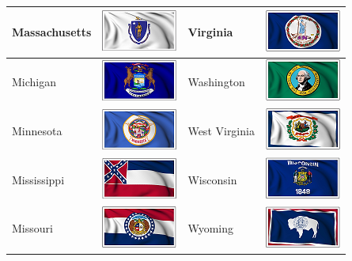 \documentclass{ximera}
\begin{document}
\begin{center}
\begin{tabular}{|l|l|l|l|}
Massachusetts & \includegraphics{pics/StateFlags/Massachusetts.png} & Virginia & \includegraphics{pics/StateFlags/Virginia.png} \\\hline 
Michigan & \includegraphics{pics/StateFlags/Michigan.png} & Washington & \includegraphics{pics/StateFlags/Washington.png} \\\hline 
Minnesota & \includegraphics{pics/StateFlags/Minnesota.png} & West Virginia & \includegraphics{pics/StateFlags/WestVirginia.png} \\\hline 
Mississippi & \includegraphics{pics/StateFlags/Mississippi.png} & Wisconsin & \includegraphics{pics/StateFlags/Wisconsin.png} \\\hline 
Missouri & \includegraphics{pics/StateFlags/Missouri.png} & Wyoming & \includegraphics{pics/StateFlags/Wyoming.png} \\\hline 
\end{tabular}

\end{center}
\end{document}
